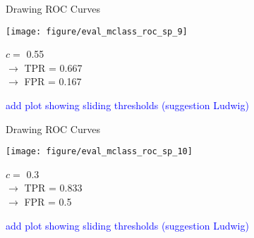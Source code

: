 \documentclass[11pt,compress,t,notes=noshow, xcolor=table]{beamer}
\newenvironment{knitrout}{}{} %
\begin{document}

\begin{vbframe}{Drawing ROC Curves}

\begin{knitrout}\scriptsize
{}\color{fgcolor}

{
\texttt{[image: figure/eval\_mclass\_roc\_sp\_9]}
}

\end{knitrout}

\vfill

\begin{minipage}[b]{0.3\textwidth}
  $c =$ 0.55\\ 
  $\rightarrow$ TPR = 0.667 \\
  $\rightarrow$ FPR = 0.167
\end{minipage}%
\begin{minipage}[b]{0.7\textwidth}
  \textcolor{blue}{add plot showing sliding thresholds (suggestion Ludwig)}
\end{minipage}

\end{vbframe}


\begin{vbframe}{Drawing ROC Curves}

\begin{knitrout}\scriptsize
{}\color{fgcolor}

{
\texttt{[image: figure/eval\_mclass\_roc\_sp\_10]} 
}

\end{knitrout}

\vfill

\begin{minipage}[b]{0.3\textwidth}
  $c =$ 0.3\\ 
  $\rightarrow$ TPR = 0.833 \\
  $\rightarrow$ FPR = 0.5
\end{minipage}%
\begin{minipage}[b]{0.7\textwidth}
  \textcolor{blue}{add plot showing sliding thresholds (suggestion Ludwig)}
\end{minipage}

\end{vbframe}
\end{document}
